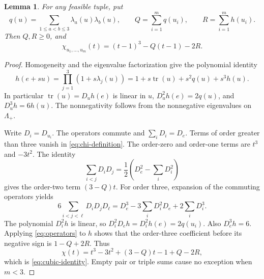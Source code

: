 \documentclass[11pt]{article}
\newtheorem{lemma}[theorem]{Lemma}
\newcommand{\tr}{\operatorname{tr}}
\newcommand{\Lam}{\Lambda_+}
\begin{document}
\begin{lemma}\label{lem:identity}
For any feasible tuple, put
\[
 q(u)=\sum_{1\leq a<b\leq3}\lambda_a(u)\lambda_b(u),\qquad
 Q=\sum_{i=1}^m q(u_i),\qquad R=\sum_{i=1}^m h(u_i).
\]
Then \(Q,R\geq0\), and
\begin{equation}\label{eq:cubic-identity}
 \chi_{u_1,\ldots,u_m}(t)=(t-1)^3-Q(t-1)-2R.
\end{equation}
\end{lemma}
\begin{proof}
Homogeneity and the eigenvalue factorization give the polynomial identity
\begin{equation}\label{eq:direction-expansion}
 h(e+su)=\prod_{j=1}^3(1+s\lambda_j(u))
 =1+s\tr(u)+s^2q(u)+s^3h(u).
\end{equation}
In particular \(\tr(u)=D_u h(e)\) is linear in \(u\),
\(D_u^2h(e)=2q(u)\), and \(D_u^3h=6h(u)\).
The nonnegativity follows from the nonnegative eigenvalues on \(\Lam\).

Write \(D_i=D_{u_i}\). The operators commute and \(\sum_iD_i=D_e\).
Terms of order greater than three vanish in \eqref{eq:chi-definition}.
The order-zero and order-one terms are \(t^3\) and \(-3t^2\).
The identity
\[
 \sum_{i<j}D_iD_j
 =\frac12\left(D_e^2-\sum_iD_i^2\right)
\]
gives the order-two term \((3-Q)t\).
For order three, expansion of the commuting operators yields
\begin{equation}\label{eq:operators}
 6\sum_{i<j<\ell}D_iD_jD_\ell
 =D_e^3-3\sum_iD_i^2D_e+2\sum_iD_i^3.
\end{equation}
The polynomial \(D_i^2h\) is linear, so
\(D_i^2D_e h=D_i^2h(e)=2q(u_i)\). Also \(D_e^3h=6\).
Applying \eqref{eq:operators} to \(h\) shows that the order-three
coefficient before its negative sign is \(1-Q+2R\). Thus
\[
 \chi(t)=t^3-3t^2+(3-Q)t-1+Q-2R,
\]
which is \eqref{eq:cubic-identity}. Empty pair or triple sums cause no
exception when \(m<3\).
\end{proof}
\end{document}
